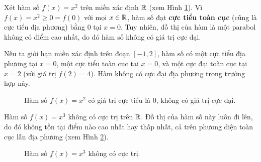 

\begin{example}\label{ex:parabola-extrema}
Xét hàm số $f(x) = x^2$ trên miền xác định $\mathbb{R}$ (xem Hình \ref{fig:parabola-extrema}). Vì $f(x) = x^2 \ge 0 = f(0)$ với mọi $x \in \mathbb{R}$, hàm số đạt \textbf{cực tiểu toàn cục} (cũng là cực tiểu địa phương) bằng 0 tại $x=0$. Tuy nhiên, đồ thị của hàm là một parabol không có điểm cao nhất, do đó hàm số không có giá trị cực đại.

Nếu ta giới hạn miền xác định trên đoạn $[-1, 2]$, hàm số có một cực tiểu địa phương tại $x=0$, một cực tiểu toàn cục tại $x=0$, và một cực đại toàn cục tại $x=2$ (với giá trị $f(2)=4$). Hàm không có cực đại địa phương trong trường hợp này.
\end{example}

\begin{figure}[H]
    \centering
    \caption{Hàm số $f(x)=x^2$ có giá trị cực tiểu là 0, không có giá trị cực đại.}
    \label{fig:parabola-extrema}
\end{figure}

\begin{example}\label{ex:cubic-no-extrema}
Hàm số $f(x) = x^3$ không có cực trị trên $\mathbb{R}$. Đồ thị của hàm số này luôn đi lên, do đó không tồn tại điểm nào cao nhất hay thấp nhất, cả trên phương diện toàn cục lẫn địa phương (xem Hình \ref{fig:cubic-no-extrema}).
\end{example}

\begin{figure}[H]
    \centering
    \caption{Hàm số $f(x)=x^3$ không có cực trị.}
    \label{fig:cubic-no-extrema}
\end{figure}

